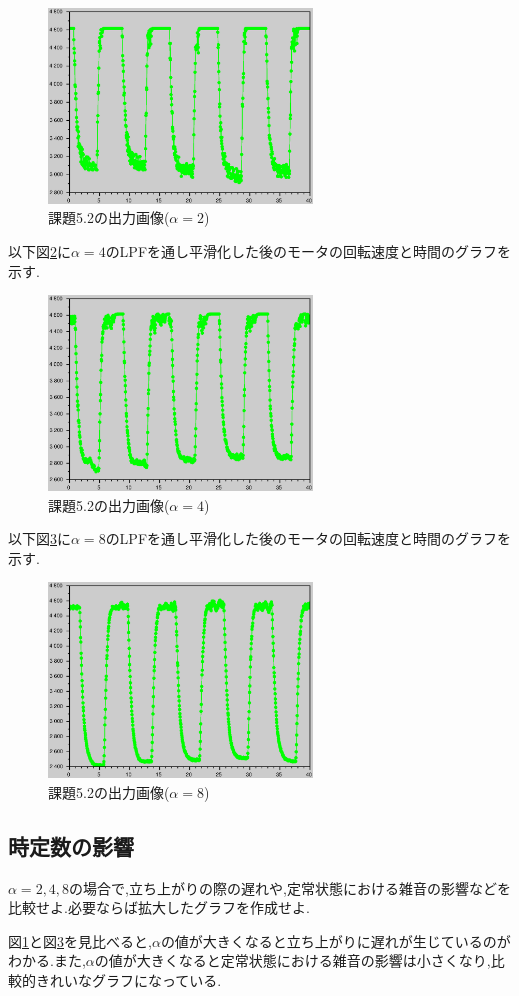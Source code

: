 \documentclass{jarticle}
\begin{document}
\begin{figure}[H]
\begin{center}
\includegraphics[width=7.0cm]{images/kadai5-2-1-3.eps}
\caption{課題5.2の出力画像($\alpha=2$)}
\label{fig:kadai5-2-1-3}
\end{center}
\end{figure}

以下図\ref{fig:kadai5-2-2-3}に$\alpha=4$のLPFを通し平滑化した後のモータの回転速度と時間のグラフを示す.

\begin{figure}[H]
\begin{center}
\includegraphics[width=7.0cm]{images/kadai5-2-2-3.eps}
\caption{課題5.2の出力画像($\alpha=4$)}
\label{fig:kadai5-2-2-3}
\end{center}
\end{figure}


以下図\ref{fig:kadai5-2-3-3}に$\alpha=8$のLPFを通し平滑化した後のモータの回転速度と時間のグラフを示す.

\begin{figure}[H]
\begin{center}
\includegraphics[width=7.0cm]{images/kadai5-2-3-3.eps}
\caption{課題5.2の出力画像($\alpha=8$)}
\label{fig:kadai5-2-3-3}
\end{center}
\end{figure}

\subsection{時定数の影響}
$\alpha=2,4,8$の場合で,立ち上がりの際の遅れや,定常状態における雑音の影響などを比較せよ.必要ならば拡大したグラフを作成せよ.

図\ref{fig:kadai5-2-1-3}と図\ref{fig:kadai5-2-3-3}を見比べると,$\alpha$の値が大きくなると立ち上がりに遅れが生じているのがわかる.また,$\alpha$の値が大きくなると定常状態における雑音の影響は小さくなり,比較的きれいなグラフになっている.
\end{document}
